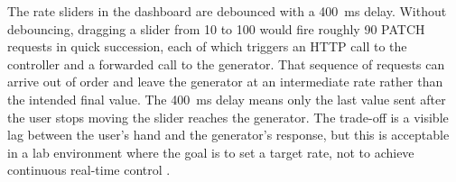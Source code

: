The rate sliders in the dashboard are debounced with a 400~ms delay.
Without debouncing, dragging a slider from 10 to 100 would fire roughly
90 PATCH requests in quick succession, each of which triggers an HTTP call
to the controller and a forwarded call to the generator. That sequence of
requests can arrive out of order and leave the generator at an
intermediate rate rather than the intended final value. The 400~ms delay
means only the last value sent after the user stops moving the slider
reaches the generator. The trade-off is a visible lag between the user's
hand and the generator's response, but this is acceptable in a lab
environment where the goal is to set a target rate, not to achieve
continuous real-time control \cite{Fielding2000}.
